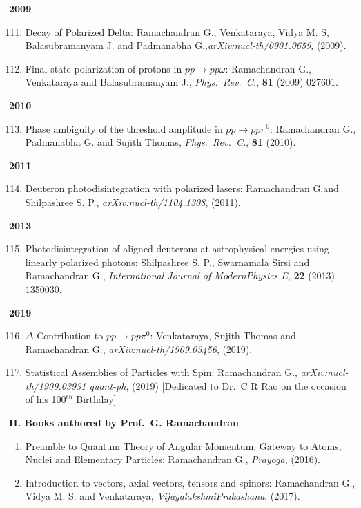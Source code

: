 \textbf{2009}
\begin{enumerate}
\setcounter{enumi}{110}
\item Decay of Polarized Delta: Ramachandran G., Venkataraya, Vidya M. S, Balasubramanyam J. and Padmanabha G.,\hfil\break \textit{arXiv:nucl-th/0901.0659}, (2009).
\item Final state polarization of protons in $pp\to pp\omega$: Ramachandran G., Venkataraya and Balasubramanyam J., \textit{Phys.\ Rev.\ C.}, {\bf 81} (2009) 027601.
\end{enumerate}
\textbf{2010}
\begin{enumerate}
\setcounter{enumi}{112}
\item Phase ambiguity of the threshold amplitude in $pp \to pp\pi^{0}$: Ramachandran G., Padmanabha G. and Sujith Thomas, \textit{Phys.\ Rev.\ C.}, {\bf 81} (2010).
\end{enumerate}
\textbf{2011}
\begin{enumerate}
\setcounter{enumi}{113}
\item Deuteron photodisintegration with polarized lasers: Ramachandran G.and Shilpashree S. P., \textit{arXiv:nucl-th/1104.1308}, (2011).
\end{enumerate}
\textbf{2013}
\begin{enumerate}
\setcounter{enumi}{114}
\item Photodisintegration of aligned deuterons at astrophysical energies using linearly polarized photons: Shilpashree S. P., Swarnamala Sirsi and Ramachandran G., \textit{International Journal of Modern\break Physics E}, {\bf 22} (2013) 1350030.
\end{enumerate}
\textbf{2019}
\begin{enumerate}
\setcounter{enumi}{115}
\item $\Delta$ Contribution to $pp\to pp\pi^{0}$: Venkataraya, Sujith Thomas and Ramachandran G., \textit{arXiv:nucl-th/1909.03456}, (2019).
\item Statistical Assemblies of Particles with Spin: Ramachandran G., \textit{arXiv:nucl-th/1909.03931 quant-ph}, (2019) [Dedicated to Dr.\ C R Rao on the occasion of his 100$^{\text{th}}$ Birthday]
\end{enumerate}

\noindent
\textbf{II. Books authored by Prof.\ G. Ramachandran}
\begin{enumerate}
\item Preamble to Quantum Theory of Angular Momentum, Gateway to Atoms, Nuclei and Elementary Particles: Ramachandran G., \textit{Prayoga}, (2016).
\item Introduction to vectors, axial vectors, tensors and spinors: Ramachandran G., Vidya M. S. and Venkataraya, \textit{Vijayalakshmi\break Prakashana}, (2017).
\end{enumerate}
